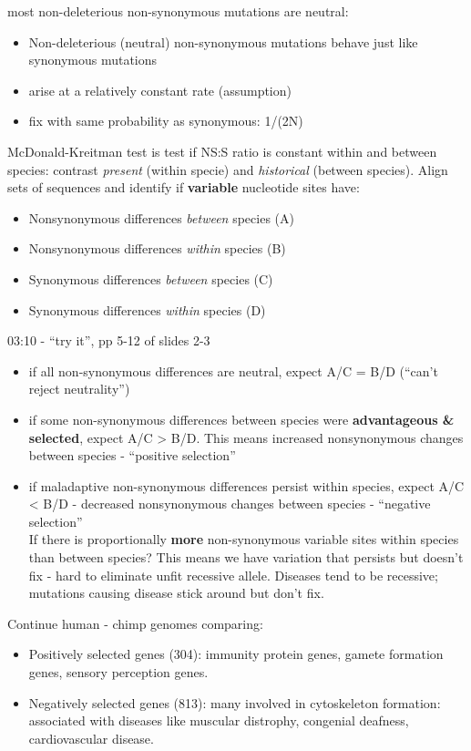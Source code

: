 \documentclass{scrartcl}
\begin{document}
most non-deleterious non-synonymous mutations are neutral:
\begin{itemize}
\item Non-deleterious (neutral) non-synonymous mutations behave just like synonymous mutations
\item arise at a relatively constant rate (assumption)
\item fix with same probability as synonymous: 1/(2N)
\end{itemize}
McDonald-Kreitman test is test if NS:S ratio is constant within and between species: contrast {\em present} (within specie) and {\em historical} (between species).
Align sets of sequences and identify if {\bf variable} nucleotide sites have:
\begin{itemize}
\item Nonsynonymous differences {\em between} species (A)
\item Nonsynonymous differences {\em within} species (B)
\item Synonymous differences {\em between} species (C)
\item Synonymous differences {\em within} species (D)
\end{itemize}
03:10 - ``try it'', pp 5-12 of slides 2-3\\
\begin{itemize}
\item if all non-synonymous differences are neutral, expect A/C = B/D (``can't reject neutrality'')
\item if some non-synonymous differences between species were {\bf advantageous \& selected}, expect A/C > B/D.
This means increased nonsynonymous changes between species - ``positive selection''
\item if maladaptive non-synonymous differences persist within species, expect A/C < B/D - decreased nonsynonymous changes between species - ``negative selection''\\
If there is proportionally {\bf more} non-synonymous variable sites within species than between species?
This means we have variation that persists but doesn't fix - hard to eliminate unfit recessive allele.
Diseases tend to be recessive; mutations causing disease stick around but don't fix.
\end{itemize}
Continue human - chimp genomes comparing:
\begin{itemize}
\item Positively selected genes (304): immunity protein genes, gamete formation genes, sensory perception genes.
\item Negatively selected genes (813): many involved in cytoskeleton formation: associated with diseases like muscular distrophy, congenial deafness, cardiovascular disease.
\end{itemize}
\end{document}

